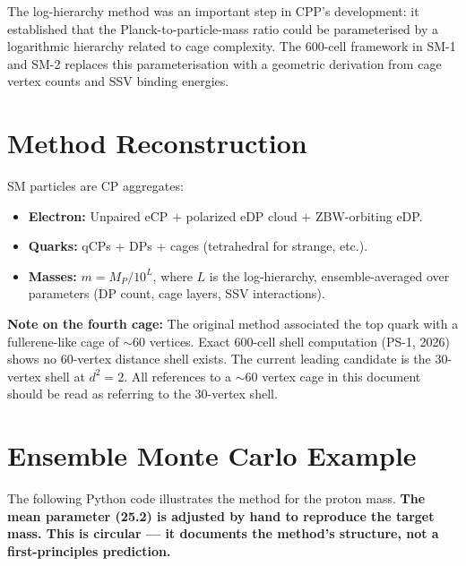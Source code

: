 \documentclass[11pt]{article}
\begin{document}
The log-hierarchy method was an important step in CPP's development: it
established that the Planck-to-particle-mass ratio could be parameterised
by a logarithmic hierarchy related to cage complexity. The 600-cell framework
in SM-1 and SM-2 replaces this parameterisation with a geometric derivation
from cage vertex counts and SSV binding energies.

\section{Method Reconstruction}

SM particles are CP aggregates:

\begin{itemize}
\item \textbf{Electron:} Unpaired eCP + polarized eDP cloud + ZBW-orbiting eDP.
\item \textbf{Quarks:} qCPs + DPs + cages (tetrahedral for strange, etc.).
\item \textbf{Masses:} $m = M_P / 10^{L}$, where $L$ is the log-hierarchy,
  ensemble-averaged over parameters (DP count, cage layers, SSV interactions).
\end{itemize}

\textbf{Note on the fourth cage:} The original method associated the top quark
with a fullerene-like cage of ${\sim}60$ vertices. Exact 600-cell shell
computation (PS-1, 2026) shows no 60-vertex distance shell exists. The
current leading candidate is the 30-vertex shell at $d^2 = 2$. All
references to a ${\sim}60$ vertex cage in this document should be read
as referring to the 30-vertex shell.

\section{Ensemble Monte Carlo Example}

The following Python code illustrates the method for the proton mass.
\textbf{The mean parameter (25.2) is adjusted by hand to reproduce the
target mass. This is circular — it documents the method's structure,
not a first-principles prediction.}
\end{document}
